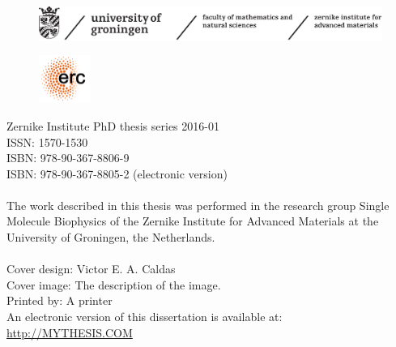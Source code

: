 \begin{titlepage}





\newpage \thispagestyle{empty}
\vspace*{3.9cm}%


\begin{figure}[!h]
	\includegraphics[width=\textwidth]{images/frontmatter/zernike.pdf}
\end{figure}

\vfill
\begin{figure}[!h]
	\includegraphics[width=0.15\textwidth]{images/frontmatter/ERC-logo.png}
\end{figure}
\noindent
{\small 
	Zernike Institute PhD thesis series 2016-01 \\
	ISSN:   1570-1530\\
	ISBN:	978-90-367-8806-9 \\
	ISBN:   978-90-367-8805-2 (electronic version) \\
	\\
	The work described in this thesis was performed in the research group Single Molecule Biophysics of the Zernike Institute for Advanced Materials at the University of Groningen, the Netherlands. \\
	\\
	Cover design: Victor E. A. Caldas\\
	Cover image: The description of the image. \\
	Printed by: A printer\\
	An electronic version of this dissertation is available at: \\
	\url{http://MYTHESIS.COM}} 	


\clearpage


\end{titlepage}


